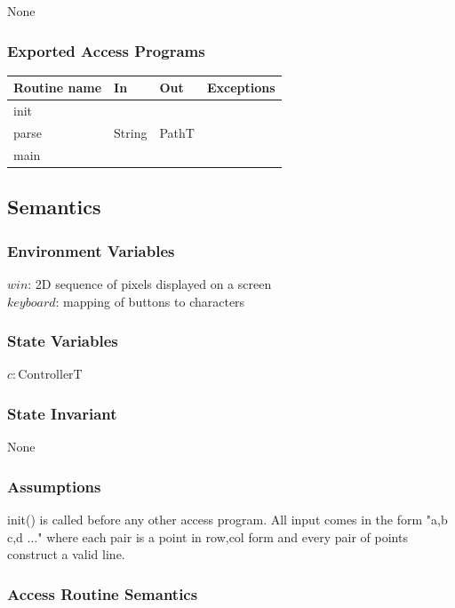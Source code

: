 \documentclass[12pt]{article}
\begin{document}
None

\subsubsection* {Exported Access Programs}

\begin{tabular}{| l | l | l | l |}
	\hline
	\textbf{Routine name} & \textbf{In} & \textbf{Out} & \textbf{Exceptions}\\
	\hline
	init & ~ & ~ & ~\\
	\hline
	parse & String & PathT & ~\\
	\hline
	main & ~ & ~ & ~\\
	\hline	
\end{tabular}

\subsection* {Semantics}

\subsubsection* {Environment Variables}

$win$: 2D sequence of pixels displayed on a screen \\
$keyboard$: mapping of buttons to characters

\subsubsection* {State Variables}

$c: \mbox{ControllerT}$

\subsubsection* {State Invariant}

None

\subsubsection* {Assumptions}

init() is called before any other access program. All input comes in the form "a,b c,d ..." where each pair is a point in row,col form and every pair of points construct a valid line.

\subsubsection* {Access Routine Semantics}
\end{document}
